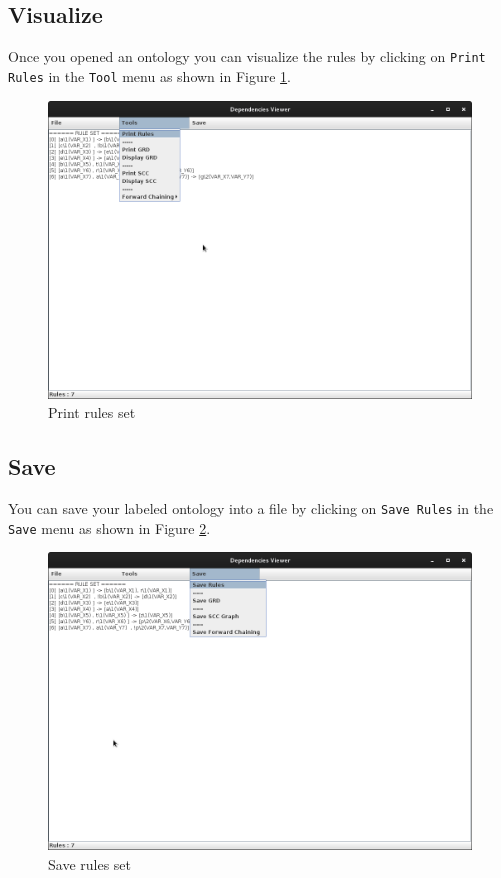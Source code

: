 \documentclass[a4paper, 10pt]{article}
\begin{document}
\subsection{Visualize}
Once you opened an ontology you can visualize the rules by clicking on \verb=Print Rules= in the \verb=Tool= menu as shown in Figure \ref{fig2}.
\begin{figure}
\begin{center}
  \includegraphics[scale=0.25]{pics/fig2.png}
  \caption{Print rules set}
\end{center}
\label{fig2}
\end{figure}

\subsection{Save}
You can save your labeled ontology into a file by clicking on \verb=Save Rules= in the \verb=Save= menu as shown in Figure \ref{fig3}.
\begin{figure}
\begin{center}
  \includegraphics[scale=0.25]{pics/fig3.png}
  \caption{Save rules set}
\end{center}
\label{fig3}
\end{figure}
\end{document}
